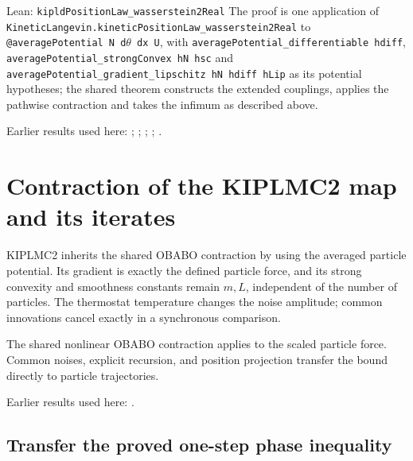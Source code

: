 \documentclass[11pt,a4paper]{report}
\begin{document}
\begin{leanbox}{Lean: \texttt{kipldPositionLaw\_\allowbreak{}wasserstein2Real}}
The proof is one application of \texttt{Kinetic\allowbreak{}Langevin.\allowbreak{}kinetic\allowbreak{}Position\allowbreak{}Law\_\allowbreak{}wasserstein2\allowbreak{}Real} to \texttt{@average\allowbreak{}Potential N d\ensuremath{\theta} dx U}, with \texttt{average\allowbreak{}Potential\_\allowbreak{}differentiable hdiff}, \texttt{average\allowbreak{}Potential\_\allowbreak{}strong\allowbreak{}Convex h\allowbreak{}N hsc} and \texttt{average\allowbreak{}Potential\_\allowbreak{}gradient\_\allowbreak{}lipschitz h\allowbreak{}N hdiff h\allowbreak{}Lip} as its potential hypotheses; the shared theorem constructs the extended couplings, applies the pathwise contraction and takes the infimum as described above.
\end{leanbox}


Earlier results used here: \cite[Section~3.17.3]{LangevinLean2026ULASC}; \cite[Section~3.17.4]{LangevinLean2026ULASC}; \cite[Section~3.1.1]{LangevinLean2026IPLA}; \cite[Section~3.2.2]{LangevinLean2026Kinetic}; \cite[Section~3.9.6]{LangevinLean2026Kinetic}.
\section{\texorpdfstring{Contraction of the KIPLMC2 map and its iterates}{Contraction of the KIPLMC2 map and its iterates}}
\label{proof-module-KIPLMC-Contraction-lean}


KIPLMC2 inherits the shared OBABO contraction by using the averaged particle potential. Its gradient is exactly the defined particle force, and its strong convexity and smoothness constants remain \(m,L\), independent of the number of particles. The thermostat temperature changes the noise amplitude; common innovations cancel exactly in a synchronous comparison.



The shared nonlinear OBABO contraction applies to the scaled particle force. Common noises, explicit recursion, and position projection transfer the bound directly to particle trajectories.



Earlier results used here: \cite[Section~3.112]{LangevinLean2026Kinetic}.
\subsection{\texorpdfstring{Transfer the proved one-step phase inequality}{Transfer the proved one-step phase inequality}}
\label{report-step-KIPLMC-Contraction-lean-1}
\end{document}
